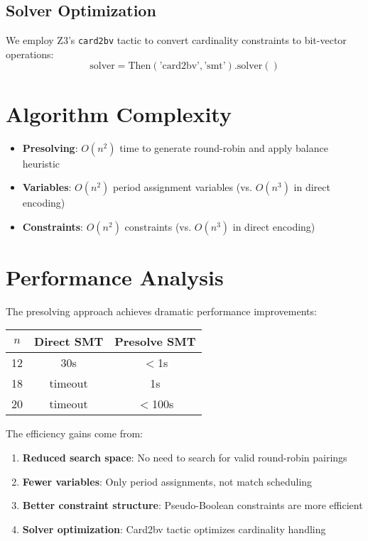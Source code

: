 \documentclass{article}
\begin{document}
\subsection{Solver Optimization}
We employ Z3's \texttt{card2bv} tactic to convert cardinality constraints to bit-vector operations:
\begin{equation}
\text{solver} = \text{Then}(\text{'card2bv'}, \text{'smt'}).\text{solver}()
\end{equation}

\section{Algorithm Complexity}

\begin{itemize}
    \item \textbf{Presolving}: $O(n^2)$ time to generate round-robin and apply balance heuristic
    \item \textbf{Variables}: $O(n^2)$ period assignment variables (vs. $O(n^3)$ in direct encoding)
    \item \textbf{Constraints}: $O(n^2)$ constraints (vs. $O(n^3)$ in direct encoding)
\end{itemize}

\section{Performance Analysis}

The presolving approach achieves dramatic performance improvements:

\begin{center}
\begin{tabular}{|c|c|c|}
\hline
$n$ & Direct SMT & Presolve SMT \\
\hline
12 & 30s & $<$1s \\
18 & timeout & 1s \\
20 & timeout & $<$100s \\
\hline
\end{tabular}
\end{center}

The efficiency gains come from:
\begin{enumerate}
    \item \textbf{Reduced search space}: No need to search for valid round-robin pairings
    \item \textbf{Fewer variables}: Only period assignments, not match scheduling
    \item \textbf{Better constraint structure}: Pseudo-Boolean constraints are more efficient
    \item \textbf{Solver optimization}: Card2bv tactic optimizes cardinality handling
\end{enumerate}
\end{document}
